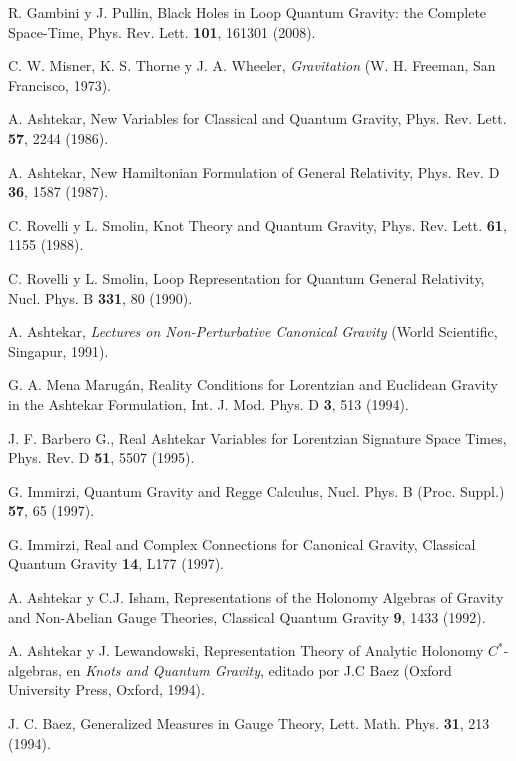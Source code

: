 \begin{thebibliography}{999}
 R. Gambini y J. Pullin, Black Holes in Loop Quantum Gravity: the Complete
Space-Time, Phys. Rev. Lett. {\bf101}, 161301 (2008).




 C. W. Misner, K. S. Thorne y J. A. Wheeler, {\it Gravitation} (W. H. Freeman, San
Francisco, 1973).

  A. Ashtekar, New Variables for Classical and Quantum Gravity, Phys. Rev. Lett.
{\bf57}, 2244 (1986).

  A. Ashtekar, New Hamiltonian Formulation of General Relativity,  Phys. Rev. D
{\bf36}, 1587 (1987).

 C. Rovelli y L. Smolin, Knot Theory and Quantum Gravity, Phys. Rev. Lett. {\bf61},
1155 (1988).

 C. Rovelli y L. Smolin, Loop Representation for Quantum General Relativity, Nucl.
Phys. B {\bf331}, 80 (1990).

 A. Ashtekar, {\it Lectures on Non-Perturbative Canonical Gravity} (World Scientific,
Singapur, 1991).

 G. A. Mena Marug\'{a}n, Reality Conditions for Lorentzian and Euclidean Gravity in
the Ashtekar Formulation, Int. J. Mod. Phys. D {\bf3}, 513 (1994).

 J. F. Barbero G.,  Real Ashtekar Variables for Lorentzian Signature Space Times,
Phys. Rev. D {\bf51}, 5507 (1995). 

 G. Immirzi, Quantum Gravity and Regge Calculus, Nucl. Phys. B (Proc. Suppl.)
{\bf 57}, 65 (1997).

 G. Immirzi, Real and Complex Connections for Canonical Gravity, Classical Quantum
Gravity {\bf14}, L177 (1997).


 A. Ashtekar y C.J. Isham, Representations of the Holonomy Algebras of Gravity
and Non-Abelian Gauge Theories, Classical Quantum Gravity {\bf9}, 1433 (1992).

 A. Ashtekar y J. Lewandowski, Representation Theory of Analytic Holonomy
$C^*$-algebras, en {\it Knots and Quantum Gravity}, editado por J.C Baez (Oxford University Press,
Oxford, 1994). 

 J. C. Baez, Generalized Measures in Gauge Theory, Lett. Math. Phys. {\bf31}, 213
(1994).


\end{thebibliography}
